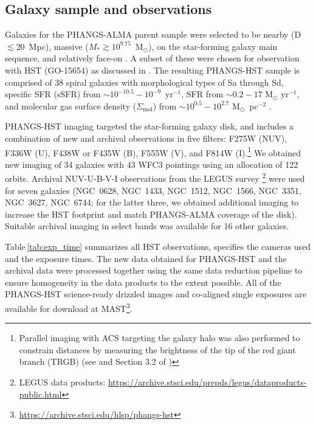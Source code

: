 \documentclass[linenumbers]{aastex63}
\newcommand{\msun}{M$_{\odot}$}
\newcommand{\sfr}{M$_{\odot}$ yr$^{-1}$}
\begin{document}


\subsection{Galaxy sample and observations}
Galaxies for the PHANGS-ALMA parent sample were selected to be nearby (D$\lesssim$20~Mpc), massive ($M_{*} \gtrsim 10^{9.75}$~\msun), on the star-forming galaxy main sequence, and relatively face-on \citep{leroy_phangs-alma_2021}.  A subset of these were chosen for observation with HST (GO-15654) as discussed in \citet{lee_phangs-hst_2022}. The resulting PHANGS-HST sample is comprised of 38 spiral galaxies with morphological types of Sa through Sd, specific SFR (sSFR) from ${\sim}10^{-10.5} {-} 10^{-9}$~yr$^{-1}$, SFR from ${\sim}0.2{-}17$ \sfr, and molecular gas surface density ($\Sigma_{\mbox{mol}}$) from ${\sim}10^{0.5}{-}10^{2.7}$ \msun~pc$^{-2}$ \citep[][Table 1 \& Figure 1]{lee_phangs-hst_2022}.

PHANGS-HST imaging targeted the star-forming galaxy disk, and includes a combination of new and archival observations in five filters: F275W (NUV), F336W (U), F438W or F435W (B), F555W (V), and F814W (I).\footnote{Parallel imaging with ACS targeting the galaxy halo was also performed to constrain distances by measuring the brightness of the tip of the red giant branch (TRGB) (see \citealt{anand_distances_2021} and Section 3.2 of \citealt{lee_phangs-hst_2022})} We obtained new imaging of 34 galaxies with 43 WFC3 pointings using an allocation of 122 orbits.  Archival NUV-U-B-V-I observations from the LEGUS survey \citep{calzetti_legacy_2015}\footnote{LEGUS data products: \url{https://archive.stsci.edu/prepds/legus/dataproducts-public.html}} were used for seven galaxies (NGC~0628, NGC~1433, NGC~1512, NGC~1566, NGC~3351, NGC~3627, NGC~6744; for the latter three, we obtained additional imaging to increase the HST footprint and match PHANGS-ALMA coverage of the disk).  Suitable archival imaging in select bands was available for 16 other galaxies.

Table\,\ref{tab:exp_time} summarizes all HST observations, specifies the cameras used and the exposure times. The new data obtained for PHANGS-HST and the archival data were processed together using the same data reduction pipeline \citep[as summarized by][]{lee_phangs-hst_2022} to ensure homogeneity in the data products to the extent possible.  All of the PHANGS-HST science-ready drizzled images and co-aligned single exposures are available for download at MAST\footnote{\url{https://archive.stsci.edu/hlsp/phangs-hst}}. 
%

%
\end{document}
